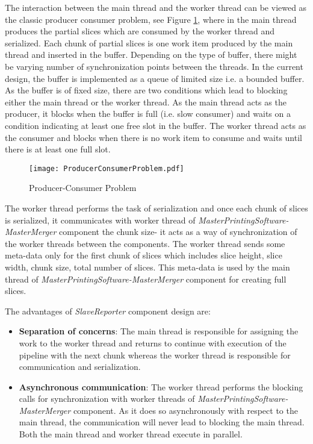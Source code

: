 The interaction between the main thread and the worker thread can be viewed as the classic producer consumer problem, see Figure \ref{fig:ProducerConsumerProblem}, where in the main thread produces the partial slices which are consumed by the worker thread and serialized. Each chunk of partial slices is one work item produced by the main thread and inserted in the buffer. Depending on the type of buffer, there might be varying number of synchronization points between the threads. In the current design, the buffer is implemented as a queue of limited size i.e. a bounded buffer. As the buffer is of fixed size, there are two conditions which lead to blocking either the main thread or the worker thread. As the main thread acts as the producer, it blocks when the buffer is full (i.e. slow consumer) and waits on a condition indicating at least one free slot in the buffer. The worker thread acts as the consumer and blocks when there is no work item to consume and waits until there is at least one full slot. \newline

\begin{figure}[t]
\centering
\texttt{[image: ProducerConsumerProblem.pdf]}
\caption{Producer-Consumer Problem}
\label{fig:ProducerConsumerProblem}
\end{figure}

The worker thread performs the task of serialization and once each chunk of slices is serialized, it communicates with worker thread of \textit{MasterPrintingSoftware-MasterMerger} component the chunk size- it acts as a way of synchronization of the worker threads between the components. The worker thread sends some meta-data  only for the first chunk of slices which includes slice height, slice width, chunk size, total number of slices. This meta-data is used by the main thread of \textit{MasterPrintingSoftware-MasterMerger} component for creating full slices.\newline

The advantages of \textit{SlaveReporter} component design are:
\begin{itemize}
\item \textbf{Separation of concerns}: The main thread is responsible for assigning the work to the worker thread and returns to continue with execution of the pipeline with the next chunk whereas the worker thread is responsible for communication and serialization.  
\item \textbf{Asynchronous communication}: The worker thread performs the blocking calls for synchronization with worker threads of \textit{MasterPrintingSoftware-MasterMerger} component. As it does so asynchronously with respect to the main thread, the communication will never lead to blocking the main thread. Both the main thread and worker thread execute in parallel.
\end{itemize} 

